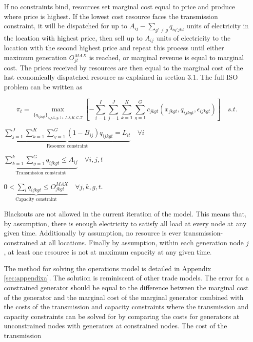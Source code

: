 \documentclass[12pt]{article}
\begin{document}
If no constraints bind, resources set marginal cost equal to price and produce where price is highest. If the lowest cost resource faces the transmission constraint, it will be dispatched for up to $A_{ij}-\sum_{g'\neq g} q_{ig'jkt}$ units of electricity in the location with highest price, then sell up to $A_{ij}$ units of electricity to the location with the second highest price and repeat this process until either maximum generation $O_{jt}^{MAX}$ is reached, or marginal revenue is equal to marginal cost. The prices received by resources are then equal to the marginal cost of the last economically dispatched resource as explained in section 3.1. The full ISO problem can be written as

\begin{equation}
\pi_{t}=\max_{\{q_{ijkgt}\}_{i,j,k,g,t\in I,J,K,G,T}} [-\sum_{i=1}^I\sum_{j=1}^J \sum_{k=1}^K \sum_{g=1}^G c_{jkgt}(x_{jkgt},q_{ijkgt},\epsilon_{ijkgt})] \mspace{18mu} s.t.
 \end{equation}
   \begin{center}
     $\underbrace{\sum_{j=1}^J\sum_{k=1}^K \sum_{g=1}^G (1-B_{ij})q_{ijkgt}=L_{it}}_\text{Resource constraint} \mspace{18mu} \forall i$
 \end{center}
 \begin{center}
    $\underbrace{\sum_{k=1}^k \sum_{g=1}^G q_{ijkgt}\leq A_{ij}}_\text{Transmission constraint} \mspace{18mu} \forall i,j,t$
 \end{center}
   \begin{center}
     $\underbrace{0<\sum_{i} q_{ijkgt}\leq O_{jkgt}^{MAX}}_\text{Capacity constraint} \mspace{18mu} \forall j,k,g,t.$
 \end{center}

 Blackouts are not allowed in the current iteration of the model. This means that, by assumption, there is enough electricity to satisfy all load at every node at any given time. Additionally by assumption, no resource is ever transmission-constrained at all locations. Finally by assumption, within each generation node $j$, at least one resource is not at maximum capacity at any given time.

The method for solving the operations model is detailed in Appendix \ref{sec:appendixa}. The solution is reminiscent of other trade models. The error for a constrained generator should be equal to the difference between the marginal cost of the generator and the marginal cost of the marginal generator combined with the costs of the transmission and capacity constraints where the transmission and capacity constraints can be solved for by comparing the costs for generators at unconstrained nodes with generators at constrained nodes. The cost of the transmission
\end{document}
